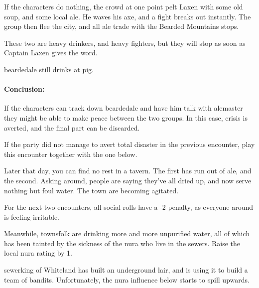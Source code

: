 \begin{multicols}{2}
If the characters do nothing, the crowd at one point pelt Laxen with some old soup, and some local ale.  He waves his axe, and a fight breaks out instantly.  The group then flee the city, and all ale trade with the Bearded Mountains stops.

\dwarvensoldier


These two are heavy drinkers, and heavy fighters, but they will stop as soon as Captain Laxen gives the word.

\dwarventrader


\humansoldier

\Gls{beardedale} still drinks at \gls{pig}.  

\paragraph{Conclusion:} If the characters can track down \gls{beardedale} and have him talk with \gls{alemaster} they might be able to make peace between the two groups.  In this case, crisis is averted, and the final part can be discarded.


If the party did not manage to avert total disaster in the previous encounter, play this encounter together with the one below.

\begin{boxtext}
	Later that day, you can find no rest in a tavern.  The first has run out of ale, and the second.  Asking around, people are saying they've all dried up, and now serve nothing but foul water.  The town are becoming agitated.
\end{boxtext}

For the next two encounters, all social rolls have a -2 penalty, as everyone around is feeling irritable.

Meanwhile, townsfolk are drinking more and more unpurified water, all of which has been tainted by the sickness of the nura who live in the sewers.  Raise the local nura rating by 1.


\Gls{sewerking} of Whiteland has built an underground lair, and is using it to build a team of bandits.
Unfortunately, the nura influence below starts to spill upwards.


\end{multicols}
